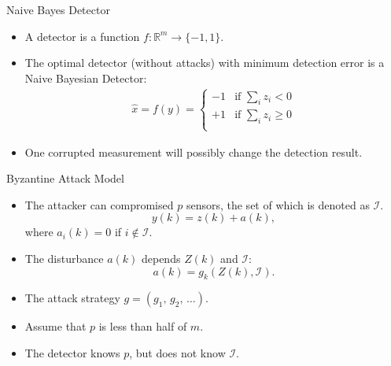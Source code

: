 \documentclass[10pt]{beamer}
\newlength\figureheight
\newlength\figurewidth
\newcommand{\tikzdir}[1]{#1.tikz}
\newcommand{\inputtikz}[1]{}}
\begin{document}
\begin{frame}{Naive Bayes Detector}
  \begin{itemize}
    \item A detector is a function $f:\mathbb R^m\rightarrow \{-1,1\}$.
    \item The optimal detector (without attacks) with minimum detection error is a Naive Bayesian Detector:
      \begin{align*}
	\hat x=f(y)=\begin{cases}
	  -1 &\text{if }\sum_{i}z_i < 0\\
	  +1 &\text{if }\sum_{i}z_i \geq 0\\
	\end{cases}
      \end{align*}
    \item One corrupted measurement will possibly change the detection result. 
  \end{itemize}
\end{frame}

\begin{frame}{Byzantine Attack Model}
  \begin{itemize}
  \item The attacker can compromised $p$ sensors, the set of which is denoted as $\mathcal I$. 
    \begin{displaymath}
      y(k) = z(k) + a(k),  
    \end{displaymath}
    where $a_i(k) = 0$ if $i\notin \mathcal I$.
    \begin{center}
      \setlength{\figureheight}{2cm}
      \setlength{\figurewidth}{10cm}
      \inputtikz{blockdiagram}
    \end{center}
  \item The disturbance $a(k)$ depends $ Z(k)$ and $\mathcal I$: 
    \begin{displaymath}
      a(k) = g_k( Z(k),\mathcal I). 
    \end{displaymath}
  \item The attack strategy $g = (g_1,\,g_2,\,\dots)$.
  \item Assume that $p$ is less than half of $m$.
  \item The detector knows $p$, but does not know $\mathcal I$.
  \end{itemize}
\end{frame}
\end{document}

